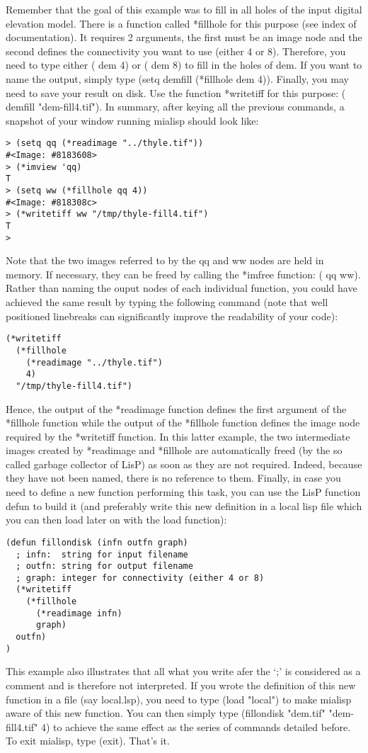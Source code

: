 \documentclass{book}
\begin{document}
Remember that the goal of this example was to fill in all holes of the input digital elevation model.  There is a function called *fillhole for this purpose (see index of documentation).  It requires 2 arguments, the first must be an image node and the second defines the connectivity you want to use (either 4 or 8).  Therefore, you need to type either ( dem 4) or ( dem 8) to fill in the holes of dem.  If you want to name the output, simply type (setq demfill (*fillhole dem 4)).  Finally, you may need to save your result on disk.  Use the function *writetiff for this purpose: ( demfill "dem-fill4.tif").  In summary, after keying all the previous commands, a snapshot of your window running mialisp should look like:
\begin{verbatim}
> (setq qq (*readimage "../thyle.tif"))
#<Image: #8183608>
> (*imview 'qq)
T
> (setq ww (*fillhole qq 4))
#<Image: #818308c>
> (*writetiff ww "/tmp/thyle-fill4.tif")
T
> 
\end{verbatim}
Note that the two images referred to by the qq and ww nodes are held in memory.  If necessary, they can be freed by calling the *imfree function: (  qq ww).  Rather than naming the ouput nodes of each individual function, you could have achieved the same result by typing the following command (note that well positioned linebreaks can significantly improve the readability of your code):
\begin{verbatim}
(*writetiff
  (*fillhole
    (*readimage "../thyle.tif")
    4)
  "/tmp/thyle-fill4.tif")
\end{verbatim}
Hence, the output of the *readimage function defines the first argument of the *fillhole function while the output of the *fillhole function defines the image node required by the *writetiff function.  In this latter example, the two intermediate images created by *readimage and *fillhole are automatically freed (by the so called garbage collector of LisP) as soon as they are not required.  Indeed, because they have not been named, there is no reference to them.  Finally, in case you need to define a new function performing this task, you can use the LisP function defun to build it (and preferably write this new definition in a local lisp file which you can then load later on with the load function):
\begin{verbatim}
(defun fillondisk (infn outfn graph)
  ; infn:  string for input filename
  ; outfn: string for output filename
  ; graph: integer for connectivity (either 4 or 8)
  (*writetiff
    (*fillhole
      (*readimage infn)
      graph)
  outfn)
)
\end{verbatim}
This example also illustrates that all what you write afer the `;' is considered as a comment and is therefore not interpreted.  If you wrote the definition of this new function in a file (say local.lsp), you need to type (load "local") to make mialisp aware of this new function.  You can then simply type (fillondisk "dem.tif" "dem-fill4.tif" 4) to achieve the same effect as the series of commands detailed before.  To exit mialisp, type (exit).  That's it.
\end{document}
